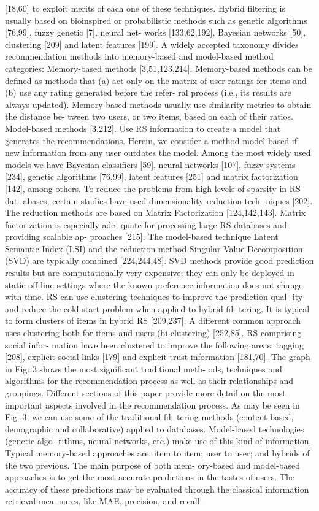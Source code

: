 \documentclass[11pt]{article}
\begin{document}
[18,60] to exploit merits of each one of these techniques. Hybrid
filtering is usually based on bioinspired or probabilistic methods
such as genetic algorithms [76,99], fuzzy genetic [7], neural net-
works [133,62,192], Bayesian networks [50], clustering [209] and
latent features [199].
A widely accepted taxonomy divides recommendation methods
into memory-based and model-based method categories:
Memory-based methods [3,51,123,214]. Memory-based methods
can be defined as methods that (a) act only on the matrix of user
ratings for items and (b) use any rating generated before the refer-
ral process (i.e., its results are always updated). Memory-based
methods usually use similarity metrics to obtain the distance be-
tween two users, or two items, based on each of their ratios.
Model-based methods [3,212]. Use RS information to create a
model that generates the recommendations. Herein, we consider
a method model-based if new information from any user outdates
the model. Among the most widely used models we have Bayesian
classifiers [59], neural networks [107], fuzzy systems [234], genetic
algorithms [76,99], latent features [251] and matrix factorization
[142], among others.
To reduce the problems from high levels of sparsity in RS dat-
abases, certain studies have used dimensionality reduction tech-
niques [202]. The reduction methods are based on Matrix
Factorization [124,142,143]. Matrix factorization is especially ade-
quate for processing large RS databases and providing scalable ap-
proaches [215]. The model-based technique Latent Semantic Index
(LSI) and the reduction method Singular Value Decomposition
(SVD) are typically combined [224,244,48]. SVD methods provide
good prediction results but are computationally very expensive;
they can only be deployed in static off-line settings where the
known preference information does not change with time.
RS can use clustering techniques to improve the prediction qual-
ity and reduce the cold-start problem when applied to hybrid fil-
tering. It is typical to form clusters of items in hybrid RS
[209,237]. A different common approach uses clustering both for
items and users (bi-clustering) [252,85]. RS comprising social infor-
mation have been clustered to improve the following areas: tagging
[208], explicit social links [179] and explicit trust information
[181,70].
The graph in Fig. 3 shows the most significant traditional meth-
ods, techniques and algorithms for the recommendation process as
well as their relationships and groupings. Different sections of this
paper provide more detail on the most important aspects involved
in the recommendation process.
As may be seen in Fig. 3, we can use some of the traditional fil-
tering methods (content-based, demographic and collaborative)
applied to databases. Model-based technologies (genetic algo-
rithms, neural networks, etc.) make use of this kind of information.
Typical memory-based approaches are: item to item; user to user;
and hybrids of the two previous. The main purpose of both mem-
ory-based and model-based approaches is to get the most accurate
predictions in the tastes of users. The accuracy of these predictions
may be evaluated through the classical information retrieval mea-
sures, like MAE, precision, and recall.
\end{document}

